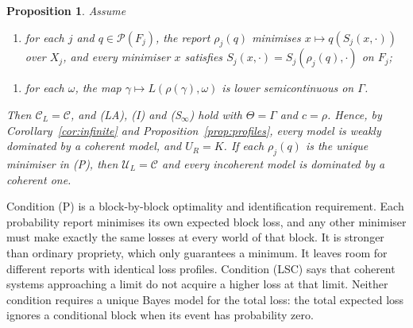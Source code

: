 \documentclass[11pt]{article}
\newtheorem{proposition}[theorem]{Proposition}
\theoremstyle{definition}
\theoremstyle{remark}
\newcommand{\C}{\mathcal C}
\newcommand{\U}{\mathcal U}
\newcommand{\PP}{\mathcal P}
\begin{document}
\begin{proposition}\label{prop:blocks}
Assume
\begin{enumerate}[label=\textbf{(P)},leftmargin=*]
\item for each $j$ and $q\in\PP(F_j)$, the report $\rho_j(q)$ minimises $x\mapsto q(S_j(x,\cdot))$ over $X_j$, and every minimiser $x$ satisfies $S_j(x,\cdot)=S_j(\rho_j(q),\cdot)$ on $F_j$;
\end{enumerate}
\begin{enumerate}[label=\textbf{(LSC)},leftmargin=*]
\item for each $\omega$, the map $\gamma\mapsto L(\rho(\gamma),\omega)$ is lower semicontinuous on $\Gamma$.
\end{enumerate}
Then $\C_L=\C$, and (LA), (I) and (S$_\infty$) hold with $\Theta=\Gamma$ and $c=\rho$. Hence, by Corollary~\ref{cor:infinite} and Proposition~\ref{prop:profiles}, every model is weakly dominated by a coherent model, and $U_R=K$. If each $\rho_j(q)$ is the \emph{unique} minimiser in (P), then $\U_L=\C$ and every incoherent model is dominated by a coherent one.
\end{proposition}

Condition (P) is a block-by-block optimality and identification requirement. Each probability report minimises its own expected block loss, and any other minimiser must make exactly the same losses at every world of that block. It is stronger than ordinary propriety, which only guarantees a minimum. It leaves room for different reports with identical loss profiles. Condition (LSC) says that coherent systems approaching a limit do not acquire a higher loss at that limit. Neither condition requires a unique Bayes model for the total loss: the total expected loss ignores a conditional block when its event has probability zero.
\end{document}
